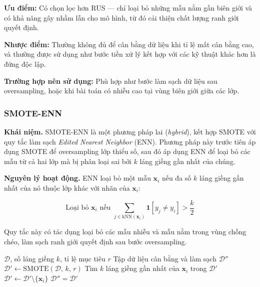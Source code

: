 \textbf{Ưu điểm:} Có chọn lọc hơn RUS --- chỉ loại bỏ những mẫu nằm gần biên giới và có khả năng gây nhầm lẫn cho mô hình, từ đó cải thiện chất lượng ranh giới quyết định.

\textbf{Nhược điểm:} Thường không đủ để cân bằng dữ liệu khi tỉ lệ mất cân bằng cao, và thường được sử dụng như bước tiền xử lý kết hợp với các kỹ thuật khác hơn là đứng độc lập.

\textbf{Trường hợp nên sử dụng:} Phù hợp như bước làm sạch dữ liệu sau oversampling, hoặc khi bài toán có nhiễu cao tại vùng biên giới giữa các lớp.

\subsubsection{SMOTE-ENN}

\textbf{Khái niệm.}
SMOTE-ENN là một phương pháp lai (\textit{hybrid}), kết hợp SMOTE với quy tắc làm sạch \textit{Edited Nearest Neighbor} (ENN). Phương pháp này trước tiên áp dụng SMOTE để oversampling lớp thiểu số, sau đó áp dụng ENN để loại bỏ các mẫu từ cả hai lớp mà bị phân loại sai bởi $k$ láng giềng gần nhất của chúng.

\textbf{Nguyên lý hoạt động.}
ENN loại bỏ một mẫu $\mathbf{x}_i$ nếu đa số $k$ láng giềng gần nhất của nó thuộc lớp khác với nhãn của $\mathbf{x}_i$:

\begin{equation}
  \text{Loại bỏ } \mathbf{x}_i \text{ nếu }
  \sum_{j \in \mathrm{kNN}(\mathbf{x}_i)} \mathbf{1}[y_j \neq y_i]
  > \frac{k}{2}
  \label{eq:enn}
\end{equation}

\noindent Quy tắc này có tác dụng loại bỏ các mẫu nhiễu và mẫu nằm trong vùng chồng chéo, làm sạch ranh giới quyết định sau bước oversampling.

\begin{algorithm}[H]
\caption{SMOTE-ENN}
\begin{algorithmic}[1]
  \Require $\mathcal{D}$, số láng giềng $k$, tỉ lệ mục tiêu $r$
  \Ensure Tập dữ liệu cân bằng và làm sạch $\mathcal{D}''$
  \State $\mathcal{D}' \leftarrow \text{SMOTE}(\mathcal{D},\, k,\, r)$
    \State Tìm $k$ láng giềng gần nhất của $\mathbf{x}_i$ trong $\mathcal{D}'$
      \State $\mathcal{D}' \leftarrow \mathcal{D}' \setminus \{\mathbf{x}_i\}$
    \EndIf
  \EndFor
  \State \Return $\mathcal{D}''= \mathcal{D}'$
\end{algorithmic}
\end{algorithm}

